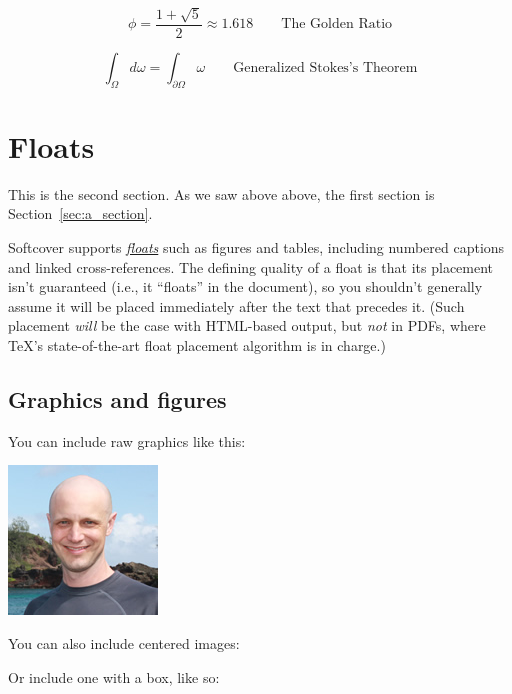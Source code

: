 \begin{equation}
\label{eq:golden_ratio}
\phi = \frac{1+\sqrt{5}}{2} \approx 1.618 \qquad{\text{The Golden Ratio}}
\end{equation}

\begin{equation}
\label{eq:stokes_theorem}
\int_\Omega d\omega = \int_{\partial\Omega} \omega \qquad{\text{Generalized Stokes's Theorem}}
\end{equation}

\section{Floats}
\label{sec:floats}

This is the second section. As we saw above above, the first section is Section~\ref{sec:a_section}.

Softcover supports \href{http://en.wikibooks.org/wiki/LaTeX/Floats,_Figures_and_Captions}{\emph{floats}} such as figures and tables, including numbered captions and linked cross-references. The defining quality of a float is that its placement isn't guaranteed (i.e., it ``floats'' in the document), so you shouldn't generally assume it will be placed immediately after the text that precedes it. (Such placement \emph{will} be the case with HTML-based output, but \emph{not} in PDFs, where \TeX's state-of-the-art float placement algorithm is in charge.)

\subsection{Graphics and figures}
\label{sec:graphics_and_figures}

You can include raw graphics like this:

\includegraphics{images/2011_michael_hartl.png}

\noindent You can also include centered images:


\noindent Or include one with a box, like so:

